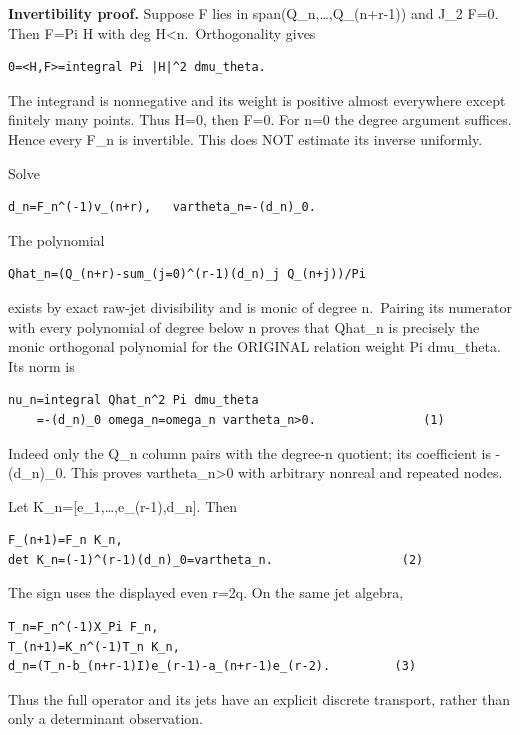 \textbf{Invertibility proof.} Suppose F lies in span(Q\_n,\ldots,Q\_(n+r-1)) and J\_2 F=0. Then F=Pi H with deg H\textless n.~Orthogonality gives

\begin{verbatim}
0=<H,F>=integral Pi |H|^2 dmu_theta.
\end{verbatim}

The integrand is nonnegative and its weight is positive almost everywhere except finitely many points. Thus H=0, then F=0. For n=0 the degree argument suffices. Hence every F\_n is invertible. This does NOT estimate its inverse uniformly.

Solve

\begin{verbatim}
d_n=F_n^(-1)v_(n+r),   vartheta_n=-(d_n)_0.
\end{verbatim}

The polynomial

\begin{verbatim}
Qhat_n=(Q_(n+r)-sum_(j=0)^(r-1)(d_n)_j Q_(n+j))/Pi
\end{verbatim}

exists by exact raw-jet divisibility and is monic of degree n.~Pairing its numerator with every polynomial of degree below n proves that Qhat\_n is precisely the monic orthogonal polynomial for the ORIGINAL relation weight Pi dmu\_theta. Its norm is

\begin{verbatim}
nu_n=integral Qhat_n^2 Pi dmu_theta
    =-(d_n)_0 omega_n=omega_n vartheta_n>0.               (1)
\end{verbatim}

Indeed only the Q\_n column pairs with the degree-n quotient; its coefficient is -(d\_n)\_0. This proves vartheta\_n\textgreater0 with arbitrary nonreal and repeated nodes.

Let K\_n={[}e\_1,\ldots,e\_(r-1),d\_n{]}. Then

\begin{verbatim}
F_(n+1)=F_n K_n,
det K_n=(-1)^(r-1)(d_n)_0=vartheta_n.                  (2)
\end{verbatim}

The sign uses the displayed even r=2q. On the same jet algebra,

\begin{verbatim}
T_n=F_n^(-1)X_Pi F_n,
T_(n+1)=K_n^(-1)T_n K_n,
d_n=(T_n-b_(n+r-1)I)e_(r-1)-a_(n+r-1)e_(r-2).         (3)
\end{verbatim}

Thus the full operator and its jets have an explicit discrete transport, rather than only a determinant observation.

